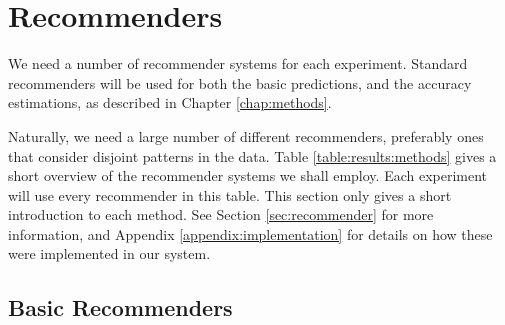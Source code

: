 \section{Recommenders}

We need a number of recommender systems for each experiment.
Standard recommenders will be used for both the basic predictions,
and the accuracy estimations,
as described in Chapter \ref{chap:methods}.

Naturally, we need a large number of different recommenders, preferably ones that consider
disjoint patterns in the data. Table \ref{table:results:methods}
gives a short overview of the recommender systems we shall employ.
Each experiment will use every recommender in this table.
This section only gives a short introduction to each method.
See Section \ref{sec:recommender} for more information, 
and Appendix \ref{appendix:implementation} for details on how these were implemented in our system.


\subsection{Basic Recommenders}

